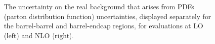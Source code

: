 




\begin{figure}[!htbp]{ 
\caption{The uncertainty on the real \gmgm background that arises from PDFs (parton distribution function) uncertainties, displayed separately for the barrel-barrel and barrel-endcap regions, for evaluations at LO (left) and NLO (right).} 
\label{Fig:sys_pdf} }
\end{figure}


